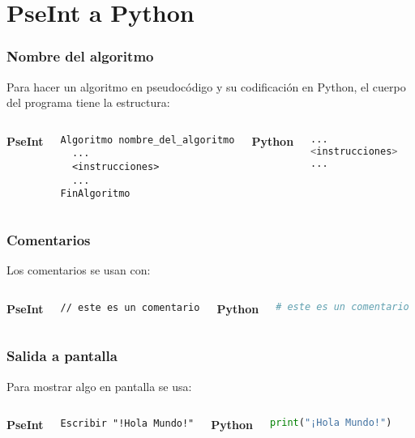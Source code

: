 
\section{PseInt a Python}

\begin{frame}[fragile]
  \frametitle{Nombre del algoritmo}

  Para hacer un algoritmo en pseudocódigo y su codificación en Python,
  el cuerpo del programa tiene la estructura:
  \vspace{\baselineskip}
  \begin{columns}
      \textbf{PseInt}
      \begin{lstlisting}[style=pseudocodigo]
Algoritmo nombre_del_algoritmo
  ...
  <instrucciones>
  ...
FinAlgoritmo
      \end{lstlisting}
    \pausa
      \textbf{Python}
      \begin{lstlisting}[language=Python]
...
<instrucciones>
...

      \end{lstlisting}
  \end{columns}
\end{frame}

\begin{frame}[fragile]
  \frametitle{Comentarios}

  Los comentarios se usan con:
  \vspace{\baselineskip}
  \begin{columns}
      \textbf{PseInt}
      \begin{lstlisting}[style=pseudocodigo]
// este es un comentario
      \end{lstlisting}
    \pausa
      \textbf{Python}
      \begin{lstlisting}[language=Python]
# este es un comentario
      \end{lstlisting}
  \end{columns}
\end{frame}

\begin{frame}[fragile]
  \frametitle{Salida a pantalla}

  Para mostrar algo en pantalla se usa:
  \vspace{\baselineskip}
  \begin{columns}
      \textbf{PseInt}
      \begin{lstlisting}[style=pseudocodigo]
Escribir "!Hola Mundo!"
      \end{lstlisting}
    \pausa
      \textbf{Python}
      \begin{lstlisting}[language=Python]
print("¡Hola Mundo!")
      \end{lstlisting}
  \end{columns}
\end{frame}

